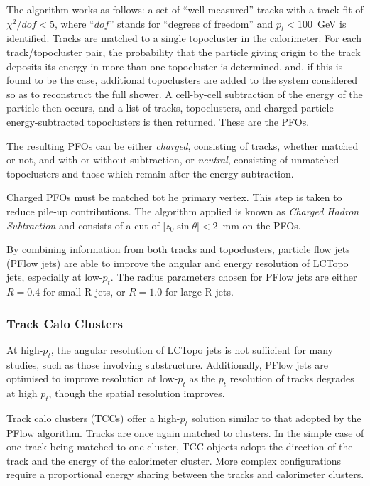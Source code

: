 \documentclass[10pt,a4paper]{book}
\begin{document}
The algorithm works as follows: a set of ``well-measured'' tracks with  a track fit of $\chi^2/dof < 5$, where ``$dof$'' stands for ``degrees of freedom'' and $p_t < 100$~GeV is identified. Tracks are matched to a single topocluster in the calorimeter. For each track/topocluster pair, the probability that the particle giving origin to the track deposits its energy in more than one topocluster is determined, and, if this is found to be the case, additional topoclusters are added to the system considered so as to reconstruct the full shower. A cell-by-cell subtraction of the energy of the particle then occurs, and a list of tracks, topoclusters, and charged-particle energy-subtracted topoclusters is then returned. These are the PFOs. 

The resulting PFOs can be either \emph{charged}, consisting of tracks, whether matched or not, and with or without subtraction, or \emph{neutral}, consisting of unmatched topoclusters and those which remain after the energy subtraction. 

Charged PFOs must be matched tot he primary vertex. This step is taken to reduce pile-up contributions. The algorithm applied is known as \emph{Charged Hadron Subtraction} and consists of a cut of $\vert z_0\sin\theta\vert < 2$~mm on the PFOs. 

By combining information from both tracks and topoclusters, particle flow jets (PFlow jets) are able to improve the angular and energy resolution of LCTopo jets, especially at low-$p_t$. The radius parameters chosen for PFlow jets are either $R = 0.4$ for small-R jets, or $R = 1.0$ for large-R jets.

\subsubsection{Track Calo Clusters}
At high-$p_t$, the angular resolution of LCTopo jets is not sufficient for many studies, such as those involving substructure. Additionally, PFlow jets are optimised to improve resolution at low-$p_t$ as the $p_t$ resolution of tracks degrades at high $p_t$, though the spatial resolution improves.

Track calo clusters (TCCs) offer a high-$p_t$ solution similar to that adopted by the PFlow algorithm. Tracks are once again matched to clusters. In the simple case of one track being matched to one cluster, TCC objects adopt the direction of the track and the energy of the calorimeter cluster. More complex configurations require a proportional energy sharing between the tracks and calorimeter clusters.
\end{document}
